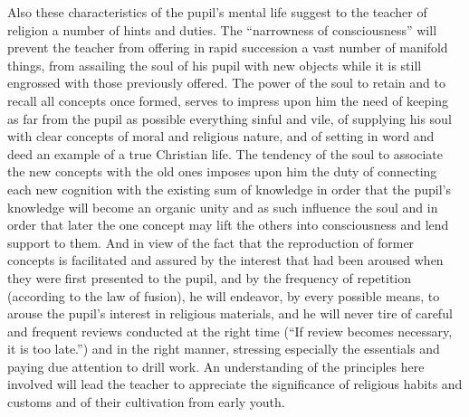 Also these characteristics of the pupil’s mental life suggest to the teacher of religion a number of hints and duties. The “narrowness of consciousness” will prevent the teacher from offering in rapid succession a vast number of manifold things, from assailing the soul of his pupil with new objects while it is still engrossed with those previously offered. The power of the soul to retain and to recall all concepts once formed, serves to impress upon him the need of keeping as far from the pupil as possible everything sinful and vile, of supplying his soul with clear concepts of moral and religious nature, and of setting in word and deed an example of a true Christian life. The tendency of the soul to associate the new concepts with the old ones imposes upon him the duty of connecting each new cognition with the existing sum of knowledge in order that the pupil’s knowledge will become an organic unity and as such influence the soul and
in order that later the one concept may lift the others into consciousness and lend support to them. And in view of the fact that the reproduction of former concepts is facilitated and assured by the interest that had been aroused when they were first presented to the pupil, and by the frequency of repetition (according to the law of fusion), he will endeavor, by every possible means, to arouse the pupil’s interest in religious materials, and he will never tire of careful and frequent reviews conducted at the right time (“If review becomes necessary, it is too late.”) and in the right manner, stressing especially the essentials and paying due attention to drill work. An understanding of the principles here involved will lead the teacher to appreciate the significance of religious habits and customs and of their cultivation from early youth.


